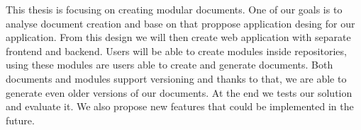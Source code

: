 This thesis is focusing on creating modular documents. One of our goals is to analyse document creation and base on
that proppose application desing for our application.
From this design we will then create web application with separate frontend and backend.
Users will be able to create modules inside repositories, using these modules are users
able to create and generate documents. Both documents and modules support versioning
and thanks to that, we are able to generate even older versions of our documents.
At the end we tests our solution and evaluate it. We also propose new features that could
be implemented in the future.
